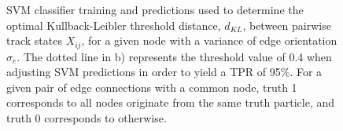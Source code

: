 \begin{figure}[htbp!] 
    \centering
    \hfill%
    \caption{SVM classifier training and predictions used to determine the optimal Kullback-Leibler threshold distance, $d_{KL}$, between pairwise track states $X_{ij}$, for a given node with a variance of edge orientation $\sigma_e$. The dotted line in b) represents the threshold value of 0.4 when adjusting SVM predictions in order to yield a TPR of 95\%. For a given pair of edge connections with a common node, truth 1 corresponds to all nodes originate from the same truth particle, and truth 0 corresponds to otherwise.}
    \label{fig:KL-distance}
\end{figure}












